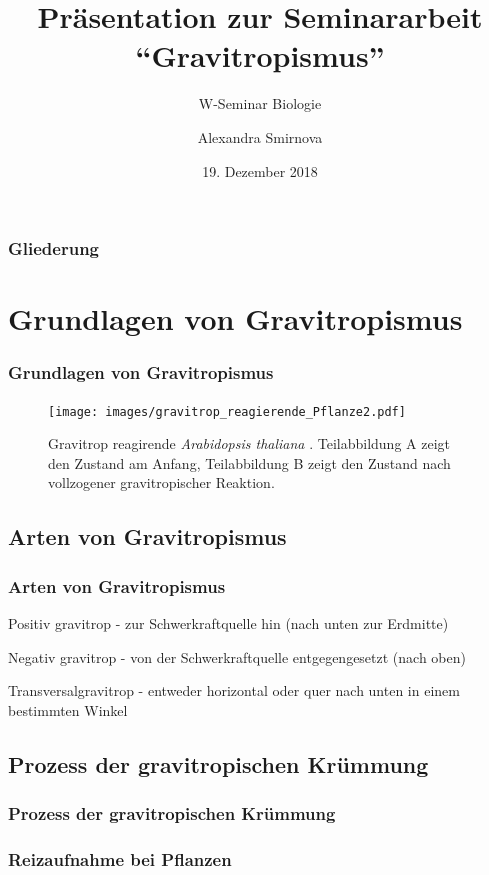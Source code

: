 \documentclass[aspectratio=169]{beamer}
\author{Alexandra Smirnova}
\title{Präsentation zur Seminararbeit \hyphenquote{ngerman}{Gravitropismus}}
\subtitle{W-Seminar Biologie}
\date{19. Dezember 2018}
\begin{document}
	\maketitle
	
	\begin{frame}
		\frametitle{Gliederung}
		\tableofcontents
	\end{frame}
	
	\section{Grundlagen von Gravitropismus}

	
	\begin{frame}
		\frametitle{Grundlagen von Gravitropismus}
		\begin{figure}[H]
			\centering 
			\texttt{[image: images/gravitrop\_reagierende\_Pflanze2.pdf]}
			\caption{Gravitrop reagirende \emph{Arabidopsis thaliana} \parencite[5]{Masson2002}. Teilabbildung A zeigt den Zustand am Anfang, Teilabbildung B zeigt den Zustand nach vollzogener gravitropischer Reaktion. \label{gravitrop_reagierende_Pflanze}}
		\end{figure} 
	\end{frame}
	
	\subsection{Arten von Gravitropismus}
	
	\begin{frame}
		\frametitle{Arten von Gravitropismus}
		Positiv gravitrop - zur Schwerkraftquelle hin (nach unten zur Erdmitte)
		
		Negativ gravitrop - von der Schwerkraftquelle entgegengesetzt (nach oben)
		
		Transversalgravitrop - entweder horizontal oder quer nach unten in einem bestimmten Winkel 
		
	\end{frame}
	
	\subsection{Prozess der gravitropischen Krümmung}
	
	\begin{frame}
		\frametitle{Prozess der gravitropischen Krümmung}
	\end{frame}
		
	\subsubsection{Reizaufnahme bei Pflanzen}
		
\end{document}
